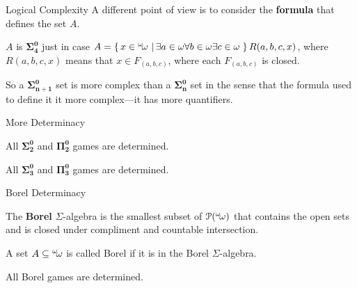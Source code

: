 \documentclass[pdf,final]{prosper}
\newcommand{\skipsmall}{\vspace{1em}}
\newcommand{\skipmed}{\vspace{2em}}
\begin{document}
\begin{slide}{Logical Complexity}
A different point of view is to consider the \textbf{formula} that defines the
set $A$.

\skipsmall

$A$ is  $\mathbf{\Sigma^0_4}$ just in case 
$A=\left\{ \, x\in{}^{\omega}\!{\omega} \, \left| \, \exists a\in\omega\forall b\in\omega\exists c\in\omega \, \right.\right\}R(a,b,c,x)$,
where $R(a,b,c,x)$ means that $x\in F_{(a,b,c)}$, where each $F_{(a,b,c)}$ is closed.

\skipsmall

So a $\mathbf{\Sigma^0_{n+1}}$ set is more complex than a
$\mathbf{\Sigma^0_{n}}$ set
in the sense that the formula used to define it it more complex---it has more quantifiers.

\end{slide}

\begin{slide}{More Determinacy}

\begin{theorem}[Wolfe 1955]
All $\mathbf{\Sigma^0_2}$ and $\mathbf{\Pi^0_2}$ games are determined.
\end{theorem}

\skipmed

\begin{theorem}[Davis 1964]
All $\mathbf{\Sigma^0_3}$ and $\mathbf{\Pi^0_3}$ games are determined.
\end{theorem}

\end{slide}

\begin{slide}{Borel Determinacy}
\begin{definition}
The \textbf{Borel} $\Sigma$-algebra is the smallest subset of
$\operatorname{\mathcal{P}}({}^{\omega}\!{\omega})$ that contains the open sets and is closed under
compliment and countable intersection.

\skipsmall

A set $A\subseteq {}^{\omega}\!{\omega}$ is called Borel if it is in the Borel $\Sigma$-algebra.
\end{definition}

\skipmed

\begin{theorem}[Martin 1975]
All Borel games are determined.
\end{theorem}

\end{slide}
\end{document}
